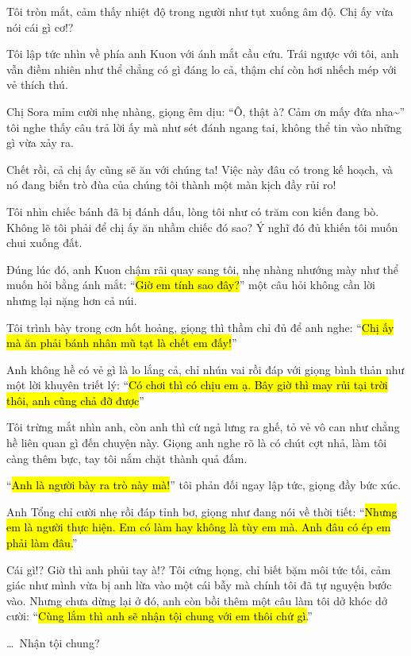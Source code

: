\documentclass[../main.tex]{subfiles}
\begin{document}
Tôi tròn mắt, cảm thấy nhiệt độ trong người như tụt xuống âm độ. Chị ấy vừa nói cái gì cơ!?

Tôi lập tức nhìn về phía anh Kuon với ánh mắt cầu cứu. Trái ngược với tôi, anh vẫn điềm nhiên như thể chẳng có gì đáng lo cả, thậm chí còn hơi nhếch mép với vẻ thích thú.

Chị Sora mỉm cười nhẹ nhàng, giọng êm dịu: ``Ô, thật à? Cảm ơn mấy đứa nha\~{}'' tôi nghe thấy câu trả lời ấy mà như sét đánh ngang tai, không thể tin vào những gì vừa xảy ra.

Chết rồi, cả chị ấy cũng sẽ ăn với chúng ta! Việc này đâu có trong kế hoạch, và nó đang biến trò đùa của chúng tôi thành một màn kịch đầy rủi ro!


Tôi nhìn chiếc bánh đã bị đánh dấu, lòng tôi như có trăm con kiến đang bò. Không lẽ tôi phải để chị ấy ăn nhầm chiếc đó sao? Ý nghĩ đó đủ khiến tôi muốn chui xuống đất.

Đúng lúc đó, anh Kuon chậm rãi quay sang tôi, nhẹ nhàng nhướng mày như thể muốn hỏi bằng ánh mắt: ``\hl{Giờ em tính sao đây?}'' một câu hỏi không cần lời nhưng lại nặng hơn cả núi.

Tôi trình bày trong cơn hốt hoảng, giọng thì thầm chỉ đủ để anh nghe: ``\hl{Chị ấy mà ăn phải bánh nhân mũ tạt là chết em đấy!}''

Anh không hề có vẻ gì là lo lắng cả, chỉ nhún vai rồi đáp với giọng bình thản như một lời khuyên triết lý: ``\hl{Có chơi thì có chịu em ạ. Bây giờ thì may rủi tại trời thôi, anh cũng chả đỡ được}''

Tôi trừng mắt nhìn anh, còn anh thì cứ ngả lưng ra ghế, tỏ vẻ vô can như chẳng hề liên quan gì đến chuyện này. Giọng anh nghe rõ là có chút cợt nhả, làm tôi càng thêm bực, tay tôi nắm chặt thành quả đấm.

``\hl{Anh là người bày ra trò này mà!}'' tôi phản đối ngay lập tức, giọng đầy bức xúc.

Anh Tổng chỉ cười nhẹ rồi đáp tỉnh bơ, giọng như đang nói về thời tiết: ``\hl{Nhưng em là người thực hiện. Em có làm hay không là tùy em mà. Anh đâu có ép em phải làm đâu.}''

Cái gì!? Giờ thì anh phủi tay à!? Tôi cứng họng, chỉ biết bặm môi tức tối, cảm giác như mình vừa bị anh lừa vào một cái bẫy mà chính tôi đã tự nguyện bước vào. Nhưng chưa dừng lại ở đó, anh còn bồi thêm một câu làm tôi dở khóc dở cười: ``\hl{Cùng lắm thì anh sẽ nhận tội chung với em thôi chứ gì.}''

\dots\ Nhận tội chung?
\end{document}
